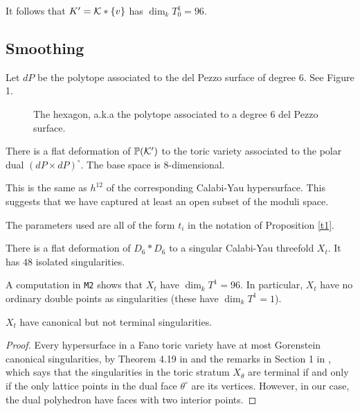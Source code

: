 \documentclass[11pt, english]{article}
\begin{document}
It follows that $K'= \mathcal K \ast \{ v \}$ has $\dim_k T^1_0 = 96$. 

\subsection{Smoothing}

Let $dP$ be the polytope associated to the del Pezzo surface of degree $6$. See Figure 1.

\begin{figure}
\label{fig:hexagon}
\centering
{}
\caption{The hexagon, a.k.a the polytope associated to a degree 6 del Pezzo surface.}
\end{figure}

\begin{prop}
There is a flat deformation of $\mathbb{P}(\mathcal K')$ to the toric variety associated to the polar dual $(dP \times dP)^\circ$. The base space is $8$-dimensional.
\end{prop}
\begin{remark}
This is the same as $h^{12}$ of the corresponding Calabi-Yau hypersurface. This suggests that we have captured at least an open subset of the moduli space.
\end{remark}

The parameters used are all of the form $t_i$ in the notation of Proposition \ref{t1}.

\begin{corr}
There is a flat deformation of $D_6 \ast D_6$ to a singular Calabi-Yau threefold $X_t$. It has $48$ isolated singularities.

A computation in \verb|M2| shows that $X_t$ have $\dim_k T^1=96$. In particular, $X_t$ have no ordinary double points as singularities (these have $\dim_k T^1=1$).
\end{corr}

\begin{prop}
$X_t$ have canonical but not terminal singularities.
\end{prop}
\begin{proof}
Every hypersurface in a Fano toric variety have at most Gorenstein canonical singularities, by Theorem 4.19 in \cite{batyrev_dualpolyhedra} and the remarks in Section 1 in \cite{batyrev_conifoldegen}, which says that the singularities in the toric stratum $X_\theta$ are terminal if and only if the only lattice points in the dual face $\theta^\circ$ are its vertices. However, in our case, the dual polyhedron have faces with two interior points.
\end{proof}

 
 
\end{document}
